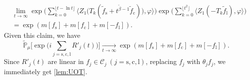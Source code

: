 \documentclass{amse-new}
\numberwithin{equation}{section}
\begin{document}
\begin{prof}
\begin{align}
\label{eq:UOT.1}
	&\lim_{t\rightarrow\infty}\exp\Big(\sum_{k=0}^{\lfloor t-\ln t \rfloor}\big \langle Z_1\big(T_{k}(\tilde f_\mathrm s+t^{\tilde{\beta}-1}\tilde{f}_\mathrm c)\big), \varphi\big\rangle \Big)\exp\Big(\sum_{k=0}^{\lfloor t^2 \rfloor}\langle Z_1(-T_k\tilde{f}_\mathrm l),\varphi\rangle\Big)
	\\& =\exp(m[f_\mathrm s]+m[f_\mathrm c]+m[-f_\mathrm l]).
\end{align}
	Given this claim, we have
\[
	\widetilde{\mathbb P}_{\mu}\Big[\exp\Big(i \sum_{j=\mathrm s,\mathrm c,\mathrm l} R'_{j}(t)\Big)\Big]
	\xrightarrow[t\to \infty]{} \exp(m[f_\mathrm s]+m[f_\mathrm c]+m[-f_\mathrm l]).
\]
	Since $R'_{j}(t)$ are linear
	 in $f_j \in \mathcal C_j~(j=\mathrm s,\mathrm c,\mathrm l)$, replacing $f_j$ with $\theta_j f_j$, we immediately get \eqref{lem:UOT}.


\end{prof}
\end{document}
